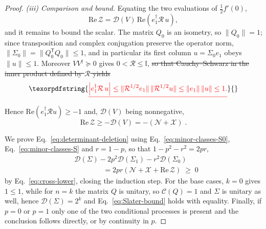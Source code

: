 \documentclass[prx,twocolumn,superscriptaddress,aps,10pt, frontmatterverbose, reprint,footinbib,longbibliography=true]{revtex4-2}
\newcommand{\trans}{\mathsf{T}}
\providecommand{\DIFaddtex}[1]{{\protect\color{red}\uwave{#1}}} %
\providecommand{\DIFdeltex}[1]{{\protect\color{red}\sout{#1}}}                      %
\providecommand{\DIFaddbegin}{\protect\color{red}} %
\providecommand{\DIFaddend}{\protect\color{black}} %
\providecommand{\DIFdelbegin}{} %
\providecommand{\DIFdelend}{} %
\providecommand{\DIFadd}[1]{\texorpdfstring{\DIFaddtex{#1}}{#1}} %
\providecommand{\DIFdel}[1]{\texorpdfstring{\DIFdeltex{#1}}{}} %
\newcommand{\DIFscaledelfig}{0.5}
\newlength{\DIFdelgraphicswidth} %
\newlength{\DIFdelgraphicsheight} %
\newcommand{\DIFaddincludegraphics}[2][]{{\color{blue}\fbox{\DIFOincludegraphics[#1]{#2}}}} %
\newcommand{\DIFdelincludegraphics}[2][]{%
\sbox{\DIFdelgraphicsbox}{\DIFOincludegraphics[#1]{#2}}%
\settoboxwidth{\DIFdelgraphicswidth}{\DIFdelgraphicsbox} %
\settoboxtotalheight{\DIFdelgraphicsheight}{\DIFdelgraphicsbox} %
\scalebox{\DIFscaledelfig}{%
\parbox[b]{\DIFdelgraphicswidth}{\usebox{\DIFdelgraphicsbox}\\[-\baselineskip] \rule{\DIFdelgraphicswidth}{0em}}\llap{\resizebox{\DIFdelgraphicswidth}{\DIFdelgraphicsheight}{%
\setlength{\unitlength}{\DIFdelgraphicswidth}%
\begin{picture}(1,1)%
\thicklines\linethickness{2pt} %
{\color[rgb]{1,0,0}\put(0,0){\framebox(1,1){}}}%
{\color[rgb]{1,0,0}\put(0,0){\line( 1,1){1}}}%
{\color[rgb]{1,0,0}\put(0,1){\line(1,-1){1}}}%
\end{picture}%
}\hspace*{3pt}}} %
} %
\DeclareRobustCommand{\DIFaddbegin}{\DIFOaddbegin \let\includegraphics\DIFaddincludegraphics} %
\DeclareRobustCommand{\DIFaddend}{\DIFOaddend \let\includegraphics\DIFOincludegraphics} %
\DeclareRobustCommand{\DIFdelbegin}{\DIFOdelbegin \let\includegraphics\DIFdelincludegraphics} %
\DeclareRobustCommand{\DIFdelend}{\DIFOaddend \let\includegraphics\DIFOincludegraphics} %
\begin{document}
\begin{proof}
\emph{(iii) Comparison and bound.} Equating the two evaluations of $\tfrac12f'(0)$,
\begin{equation}
    \mathrm{Re}\,\mathcal{Z}=\mathcal{D}(V)\,\mathrm{Re}\!\left(e_1^\dagger\mathcal{R}\,u\right),
\end{equation}
and it remains to bound the scalar. The matrix $Q_0$ is an isometry, so $\lVert Q_0\rVert=1$; since transposition and complex conjugation preserve the operator norm, $\lVert\Sigma_0\rVert=\lVert Q_0^{\trans}Q_0\rVert\le1$, and in particular its first column $u=\Sigma_0e_1$ obeys $\lVert u\rVert\le1$. Moreover $VV^\dagger\succeq0$ gives $0<\mathcal{R}\le\mathbb{I}$, \DIFdelbegin \DIFdel{so that Cauchy--Schwarz in the inner product defined by $\mathcal{R}$ yields
}\begin{displaymath}
    \DIFdel{\left|e_1^\dagger\mathcal{R}\,u\right|\le\lVert\mathcal{R}^{1/2}e_1\rVert\,\lVert\mathcal{R}^{1/2}u\rVert\le\lVert e_1\rVert\,\lVert u\rVert\le1 .
}\end{displaymath}%
\DIFdelend \DIFaddbegin \DIFadd{hence $\lVert\mathcal{R}\rVert\le1$ and $|e_1^\dagger\mathcal{R}\,u|\le\lVert\mathcal{R}\rVert\,\lVert u\rVert\le1$.
}\DIFaddend Hence $\mathrm{Re}(e_1^\dagger\mathcal{R}u)\ge-1$ and, $\mathcal{D}(V)$ being nonnegative,
\begin{equation}
    \mathrm{Re}\,\mathcal{Z}\ge-\mathcal{D}(V)=-(\mathcal{N}+\mathcal{X})\;.
    \label{eq:cross-lower}
\end{equation}

We prove Eq.~\eqref{eq:determinant-deletion} using Eq.~\eqref{eq:minor-classes-S0}, Eq.~\eqref{eq:minor-classes-S} and $r=1-p$, so that $1-p^2-r^2=2pr$,
\begin{equation}
\begin{split}
    &\mathcal{D}(\Sigma)-2p^2\mathcal{D}(\Sigma_1)-r^2\mathcal{D}(\Sigma_0)\\
    &\qquad\qquad =2pr\left(\mathcal{N}+\mathcal{X}+\mathrm{Re}\,\mathcal{Z}\right)\;\ge\;0
    \end{split}
\end{equation} 
by Eq.~\eqref{eq:cross-lower}, closing the induction step. For the base cases, $k=0$ gives $1\le1$, while for $n=k$ the matrix $Q$ is unitary, so $\mathcal{C}(Q)=1$ and $\Sigma$ is unitary as well, hence $\mathcal{D}(\Sigma)=2^k$ and Eq.~\eqref{eq:Slater-bound} holds with equality. Finally, if $p=0$ or $p=1$ only one of the two conditional processes is present and the conclusion follows directly, or by continuity in $p$.
\end{proof}
\end{document}
